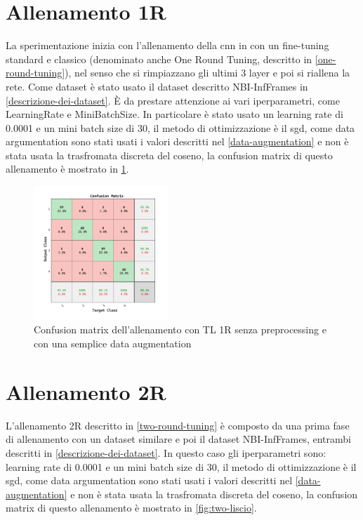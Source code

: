 \section{Allenamento 1R}\label{allenamento-1r}

La sperimentazione inizia con l'allenamento della \gls{cnn} in con un fine-tuning standard e classico (denominato anche One Round Tuning, descritto in \cref{one-round-tuning}), nel senso che si rimpiazzano gli ultimi 3 layer e poi si riallena la rete. Come dataset è stato usato il dataset descritto NBI-InfFrames in \cref{descrizione-dei-dataset}. È da prestare attenzione ai vari iperparametri, come \Gls{LearningRate} e \Gls{MiniBatchSize}. In particolare è stato usato un learning rate di 0.0001 e un mini batch size di 30, il metodo di ottimizzazione è il \gls{sgd}, come data argumentation sono stati usati i valori descritti nel \cref{data-augmentation} e non è stata usata la trasfromata discreta del coseno, la confusion matrix di questo allenamento è mostrato in \cref{fig:one-liscio}.


\begin{figure}[ht]
    \centering
    \includegraphics[width=0.45\textwidth]{addestramento-rete-neurale/one-liscio.pdf}
    \caption{Confusion matrix dell'allenamento con TL 1R senza preprocessing e con una semplice data augmentation}
    \label{fig:one-liscio}
\end{figure}

\section{Allenamento 2R}\label{allenamento-2r}

L'allenamento 2R descritto in \cref{two-round-tuning} è composto da una prima fase di allenamento con un dataset similare e poi il dataset NBI-InfFrames, entrambi descritti in  \cref{descrizione-dei-dataset}. In questo caso gli iperparametri sono:   learning rate di 0.0001 e un mini batch size di 30, il metodo di ottimizzazione è il \gls{sgd}, come data argumentation sono stati usati i valori descritti nel \cref{data-augmentation} e non è stata usata la trasfromata discreta del coseno, la confusion matrix di questo allenamento è mostrato in \cref{fig:two-liscio}.


